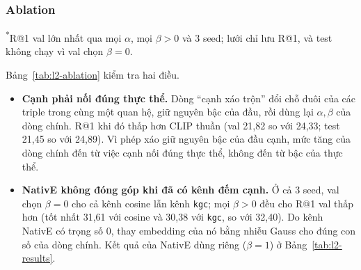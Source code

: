 \subsubsection{Ablation}\label{sec:l2-ablation}

\begin{table}[t]
\centering
\caption{Ablation của kênh đồ thị trên MKG-W (892 truy vấn mỗi split). Các dòng dùng 3 seed của NativE; $\alpha,\beta$
lấy từ val.}
\label{tab:l2-ablation}
\footnotesize
\setlength{\tabcolsep}{2.5pt}
\par\smallskip
{\scriptsize\raggedright \textsuperscript{*}R@1 val lớn nhất qua mọi $\alpha$, mọi $\beta>0$ và 3 seed; lưới chỉ lưu R@1, và
test không chạy vì val chọn $\beta=0$.\par}
\end{table}

Bảng~\ref{tab:l2-ablation} kiểm tra hai điều.
\begin{itemize}
\item \textbf{Cạnh phải nối đúng thực thể.} Dòng ``cạnh xáo trộn'' đổi chỗ đuôi của các triple trong cùng một quan hệ, giữ
nguyên bậc của đầu, rồi dùng lại $\alpha,\beta$ của dòng chính. R@1 khi đó thấp hơn CLIP thuần (val 21,82 so với 24,33; test
21,45 so với 24,89). Vì phép xáo giữ nguyên bậc của đầu cạnh, mức tăng của dòng chính đến từ việc cạnh nối đúng thực thể,
không đến từ bậc của thực thể.
\item \textbf{NativE không đóng góp khi đã có kênh đếm cạnh.} Ở cả 3 seed, val chọn $\beta = 0$ cho cả kênh cosine lẫn kênh
\texttt{kgc}; mọi $\beta > 0$ đều cho R@1 val thấp hơn (tốt nhất 31,61 với cosine và 30,38 với \texttt{kgc}, so với 32,40).
Do kênh NativE có trọng số 0, thay embedding của nó bằng nhiễu Gauss cho đúng con số của dòng chính. Kết quả của NativE
dùng riêng ($\beta = 1$) ở Bảng~\ref{tab:l2-results}.
\end{itemize}
